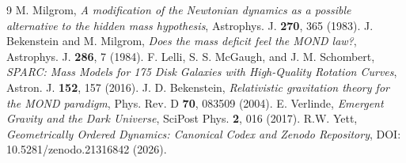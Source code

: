 \documentclass[11pt]{article}
\theoremstyle{definition}
\theoremstyle{remark}
\begin{document}
\begin{thebibliography}{9}
 M. Milgrom, \emph{A modification of the Newtonian dynamics as a possible alternative to the hidden mass hypothesis}, Astrophys. J. \textbf{270}, 365 (1983).
 J. Bekenstein and M. Milgrom, \emph{Does the mass deficit feel the MOND law?}, Astrophys. J. \textbf{286}, 7 (1984).
 F. Lelli, S. S. McGaugh, and J. M. Schombert, \emph{SPARC: Mass Models for 175 Disk Galaxies with High-Quality Rotation Curves}, Astron. J. \textbf{152}, 157 (2016).
 J. D. Bekenstein, \emph{Relativistic gravitation theory for the MOND paradigm}, Phys. Rev. D \textbf{70}, 083509 (2004).
 E. Verlinde, \emph{Emergent Gravity and the Dark Universe}, SciPost Phys. \textbf{2}, 016 (2017).
 R.W. Yett, \emph{Geometrically Ordered Dynamics: Canonical Codex and Zenodo Repository}, DOI: 10.5281/zenodo.21316842 (2026).
\end{thebibliography}
\end{document}
